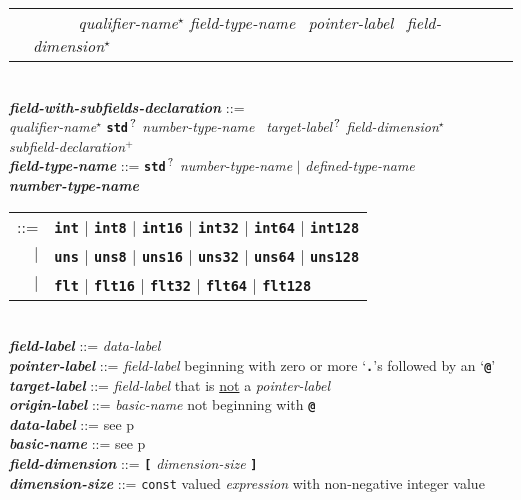 \documentclass[12pt]{article}
\newcommand{\TT}[1]{{\tt \bfseries #1}}
\newcommand{\STAR}{{\Large $^\star$}}
\newcommand{\PLUS}[1][]{{$^{+#1}$}}
\newcommand{\QMARK}{{$^{\,\mbox{\footnotesize ?}}$}}
\newcommand{\ttkey}[1]{{\tt \bfseries #1}}
\newcommand{\emkey}[1]{{\em \bfseries #1}}
\newcommand{\pagref}[1]{p\pageref{#1}}
\newenvironment{indpar}[1][0.3in]%
	{\begin{list}{}%
		     {\setlength{\itemsep}{0in}%
		      \setlength{\topsep}{0in}%
		      \setlength{\parsep}{1ex}%
		      \setlength{\labelwidth}{#1}%
		      \setlength{\leftmargin}{#1}%
		      \addtolength{\leftmargin}{\labelsep}}%
	 \item}%
	{\end{list}}
\begin{document}
\begin{indpar}
\begin{tabular}{rl}
        & ~~~~~ {\em qualifier-name}\STAR{} {\em field-type-name}~
                {\em pointer-label}~ {\em field-dimension}\STAR{}
	\end{tabular}
\\[2ex]
\emkey{field-with-subfields-declaration} ::= \\
\hspace*{0.5in}
    {\em qualifier-name}\STAR{}
    \TT{std}\QMARK{} {\em number-type-name}~ {\em target-label}\QMARK{}
                {\em field-dimension}\STAR{} \\
\hspace*{0.5in}
    {\em subfield-declaration}\PLUS{}
\\[2ex]
\emkey{field-type-name} ::= \TT{std}\QMARK{} {\em number-type-name}
                        $|$ {\em defined-type-name} \\
\emkey{number-type-name}
    \begin{tabular}[t]{@{}rl}
    ::= &  \ttkey{int} $|$ \ttkey{int8} $|$ \ttkey{int16} $|$ \ttkey{int32}
                       $|$ \ttkey{int64} $|$ \ttkey{int128} \\
    $|$ &  \ttkey{uns} $|$ \ttkey{uns8} $|$ \ttkey{uns16} $|$ \ttkey{uns32}
                       $|$ \ttkey{uns64} $|$ \ttkey{uns128} \\
    $|$ &  \ttkey{flt} $|$ \ttkey{flt16} $|$ \ttkey{flt32} $|$ \ttkey{flt64}
                         $|$ \ttkey{flt128} \\
    \end{tabular}
\\[2ex]
\emkey{field-label}\label{FIELD-LABEL} ::=  {\em data-label} \\
\emkey{pointer-label}\label{POINTER-LABEL} ::=
    {\em field-label} beginning with zero or more `\TT{.}'s followed by
    an `\TT{@}' \\
\emkey{target-label}\label{TARGET-LABEL} ::=
    {\em field-label} that is \underline{not} a {\em pointer-label} \\
\emkey{origin-label}\label{ORIGIN-LABEL} ::=
    {\em basic-name} not beginning with \TT{@} \\
\emkey{data-label} ::=  see \pagref{DATA-LABEL} \\
\emkey{basic-name} ::=  see \pagref{BASIC-NAME}
\\[2ex]
\emkey{field-dimension} ::=  \TT{[} {\em dimension-size} \TT{]} \\
\emkey{dimension-size} ::=  {\tt const} valued {\em expression}
			    with non-negative integer value
\\[2ex]

\end{indpar}
\end{document}
